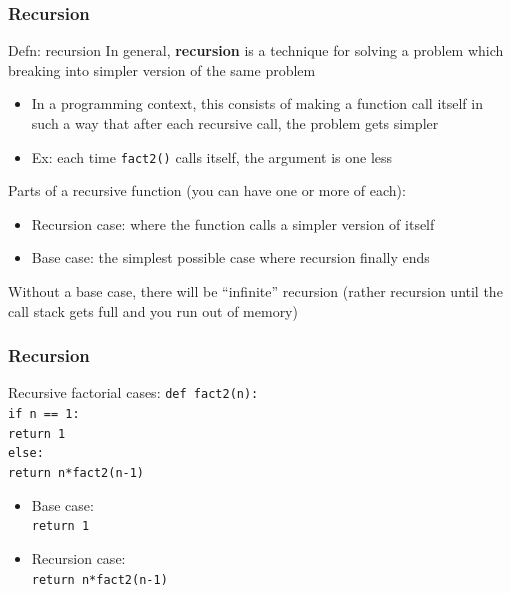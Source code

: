 \documentclass{beamer}
\newcommand{\code}[1]{\texttt{#1}}
\newcommand{\tab}{\hspace*{22pt}}
\begin{document}
\begin{frame}%
	\frametitle{Recursion}
	
	\begin{alertblock}{Defn: recursion}
		In general, \textbf{recursion} is a technique for solving a problem which breaking into simpler version of the same problem
		\begin{itemize}
			\item In a programming context, this consists of making a function call itself in such a way that after each recursive call, the problem gets simpler
			\item Ex: each time \code{fact2()} calls itself, the argument is one less
		\end{itemize}
		Parts of a recursive function (you can have one or more of each):
		\begin{itemize}
			\item Recursion case: where the function calls a simpler version of itself
			\item Base case: the simplest possible case where recursion finally ends
		\end{itemize}
		Without a base case, there will be ``infinite'' recursion (rather recursion until the call stack gets full and you run out of memory)
	\end{alertblock}
	
\end{frame}

\begin{frame}%
	\frametitle{Recursion}
	
	\begin{block}{Recursive factorial cases:}
			\code{def fact2(n): \\
					\tab if n == 1: \\
					\tab \tab return 1 \\
					\tab else: \\
					\tab \tab return n*fact2(n-1)
			}
		\endminipage\hfill
			\begin{itemize}
				\item Base case: \\
					\code{return 1}
				\item Recursion case: \\
					\code{return n*fact2(n-1)}
			\end{itemize}
		\endminipage\hfill
	\end{block}
	
\end{frame}
\end{document}

